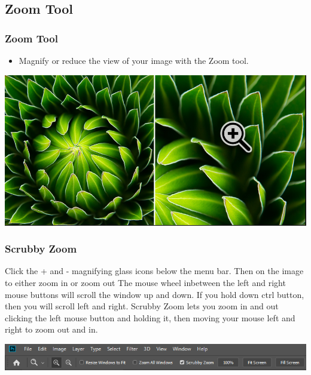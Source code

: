 \documentclass{beamer}
\begin{document}
\subsection{Zoom Tool}
\begin{frame}
	\frametitle{Zoom Tool}
	\begin{itemize}
		\item Magnify or reduce the view of your image with the Zoom tool.
	\end{itemize}
	\begin{center}
		\includegraphics[width = 1.0\textwidth]{images/zoom.png}
	\end{center}
\end{frame}

\begin{frame}
	\frametitle{Scrubby Zoom}
	\begin{outline}
		\1 Click the + and - magnifying glass icons below the menu bar.
		\2 Then on the image to either zoom in or zoom out
		\1 The mouse wheel inbetween the left and right mouse buttons will scroll the window up and down.
		\2 If you hold down ctrl button, then you will scroll left and right.
		\1 Scrubby Zoom lets you zoom in and out clicking the left mouse button and holding it, then moving your mouse left and right to zoom out and in.
	\end{outline}
	\begin{center}
		\includegraphics[width = 1.0\textwidth]{images/zoom menu.png}
	\end{center}
\end{frame}
\end{document}

